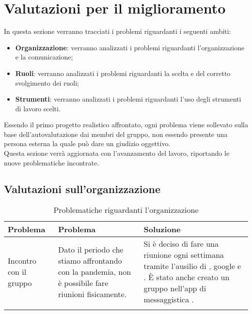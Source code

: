 \section{Valutazioni per il miglioramento}
In questa sezione verranno tracciati i problemi riguardanti i seguenti ambiti:
\begin{itemize}
	\item \textbf{Organizzazione}: verranno analizzati i problemi riguardanti l'organizzazione e la comunicazione;
	\item \textbf{Ruoli}: verranno analizzati i problemi riguardanti la scelta e del corretto svolgimento dei ruoli;
	\item \textbf{Strumenti}: verranno analizzati i problemi riguardanti l'uso degli strumenti di lavoro scelti.
\end{itemize}
Essendo il primo progetto realistico affrontato, ogni problema viene sollevato sulla base dell'autovalutazione dai membri del gruppo, non essendo presente una persona esterna la quale può dare un giudizio oggettivo.\\
Questa sezione verrà aggiornata con l'avanzamento del lavoro, riportando le nuove problematiche incontrate.
	\subsection{Valutazioni sull'organizzazione}
	\begin{center}
		\begin{longtable}{|C{2cm}|p{6cm}|p{6cm}|}
			\hline
			\textbf{Problema} & \textbf{Problema} & \textbf{Soluzione}  \\ 			
			\hline
			\endhead
			
			\hline
			Incontro con il gruppo & Dato il periodo che stiamo affrontando con la pandemia, non è possibile fare riunioni fisicamente. & Si è deciso di fare una riunione ogni settimana tramite l'ausilio di , google  e . È stato anche creato un gruppo nell'app di messaggistica .\\
			\hline			
			\hiderowcolors
			\caption{Problematiche riguardanti l'organizzazione}		
		\end{longtable}	
	\end{center}
